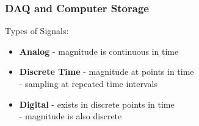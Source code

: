 \documentclass[fleqn]{beamer} %
\newcommand{\sectionIsubsectionItitle}{DAQ and Computer Storage}
\begin{document}
			
			\begin{frame}
				\frametitle{\sectionIsubsectionItitle}

				Types of Signals: \vspace{3mm}\\

				\begin{itemize}
					\item \textbf{Analog} - magnitude is continuous in time   \vspace{3mm} \\
					\item \textbf{Discrete Time} - magnitude at points in time  \vspace{3mm} \\
					\hspace*{15mm} - sampling at repeated time intervals  \vspace{3mm} \\
					\item \textbf{Digital} - exists in discrete points in time  \vspace{3mm} \\
								 - magnitude is also discrete  \vspace{3mm} \\
				\end{itemize}
		
			\end{frame}
\end{document}
